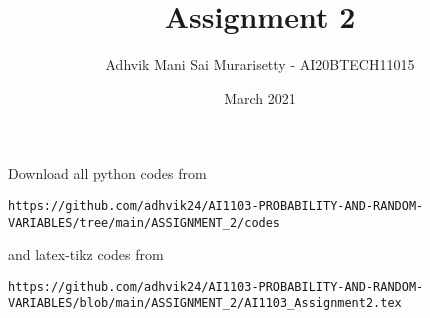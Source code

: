 \documentclass[journal,12pt,twocolumn]{IEEEtran}
\date{March 2021}
\DeclareMathOperator*{\Res}{Res}
\begin{document}
\newcommand{\BEQA}{\begin{eqnarray}}
\newcommand{\EEQA}{\end{eqnarray}}
\newcommand{\define}{\stackrel{\triangle}{=}}

\raggedbottom
\setlength{\parindent}{0pt}
\providecommand{\mbf}{\mathbf}
\providecommand{\pr}[1]{\ensuremath{\Pr\left(#1\right)}}
\providecommand{\qfunc}[1]{\ensuremath{Q\left(#1\right)}}
\providecommand{\fn}[1]{\ensuremath{f\left(#1\right)}}
\providecommand{\e}[1]{\ensuremath{E\left(#1\right)}}
\providecommand{\sbrak}[1]{\ensuremath{{}\left[#1\right]}}
\providecommand{\lsbrak}[1]{\ensuremath{{}\left[#1\right.}}
\providecommand{\rsbrak}[1]{\ensuremath{{}\left.#1\right]}}
\providecommand{\brak}[1]{\ensuremath{\left(#1\right)}}
\providecommand{\lbrak}[1]{\ensuremath{\left(#1\right.}}
\providecommand{\rbrak}[1]{\ensuremath{\left.#1\right)}}
\providecommand{\cbrak}[1]{\ensuremath{\left\{#1\right\}}}
\providecommand{\lcbrak}[1]{\ensuremath{\left\{#1\right.}}
\providecommand{\rcbrak}[1]{\ensuremath{\left.#1\right\}}}
\theoremstyle{remark}
\newtheorem{rem}{Remark}
\newcommand{\sgn}{\mathop{\mathrm{sgn}}}
\providecommand{\abs}[1]{\vert#1\vert}
\providecommand{\res}[1]{\Res\displaylimits_{#1}} 
\providecommand{\norm}[1]{\lVert#1\rVert}
\providecommand{\mtx}[1]{\mathbf{#1}}
\providecommand{\mean}[1]{E[ #1 ]}
\providecommand{\fourier}{\overset{\mathcal{F}}{ \rightleftharpoons}}
\providecommand{\system}{\overset{\mathcal{H}}{ \longleftrightarrow}}
\newcommand{\solution}{\noindent \textbf{Solution: }}
\newcommand{\cosec}{\,\text{cosec}\,}
\providecommand{\dec}[2]{\ensuremath{\overset{#1}{\underset{#2}{\gtrless}}}}
\newcommand{\myvec}[1]{\ensuremath{\begin{pmatrix}#1\end{pmatrix}}}
\newcommand{\mydet}[1]{\ensuremath{\begin{vmatrix}#1\end{vmatrix}}}
\makeatletter
\vspace{3cm}
\title{Assignment 2}
\author{Adhvik Mani Sai Murarisetty - AI20BTECH11015}
\maketitle
\newpage
\bigskip
\renewcommand{\thetable}{\theenumi}
Download all python codes from 
\begin{lstlisting}
https://github.com/adhvik24/AI1103-PROBABILITY-AND-RANDOM-VARIABLES/tree/main/ASSIGNMENT_2/codes
\end{lstlisting}
%
and latex-tikz codes from 
%
\begin{lstlisting}
https://github.com/adhvik24/AI1103-PROBABILITY-AND-RANDOM-VARIABLES/blob/main/ASSIGNMENT_2/AI1103_Assignment2.tex
\end{lstlisting}
\end{document}
